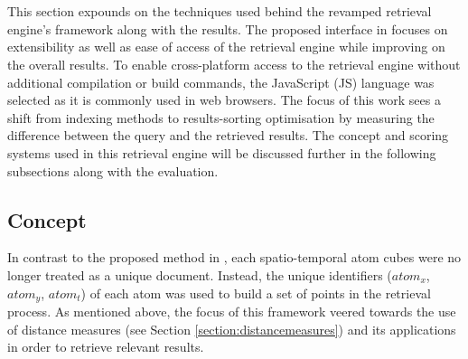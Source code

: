 \section{\versionTwoRet}
\label{section:versionTwo}

This section expounds on the techniques used behind the revamped retrieval engine's framework along with the results. The proposed interface in \versionTwoRet focuses on extensibility as well as ease of access of the retrieval engine while improving on the overall results. To enable cross-platform access to the retrieval engine without additional compilation or build commands, the JavaScript (JS) language was selected as it is commonly used in web browsers.
The focus of this work sees a shift from indexing methods to results-sorting optimisation by measuring the difference between the query and the retrieved results. The concept and scoring systems used in this retrieval engine will be discussed further in the following subsections along with the evaluation.

\subsection{Concept}

In contrast to the proposed method in \versionOneRet, each spatio-temporal atom cubes were no longer treated as a unique document. Instead, the unique identifiers ($atom_x$, $atom_y$, $atom_t$) of each atom was used to build a set of points in the retrieval process. As mentioned above, the focus of this framework veered towards the use of distance measures (see Section \ref{section:distancemeasures}) and its applications in order to retrieve relevant results.

